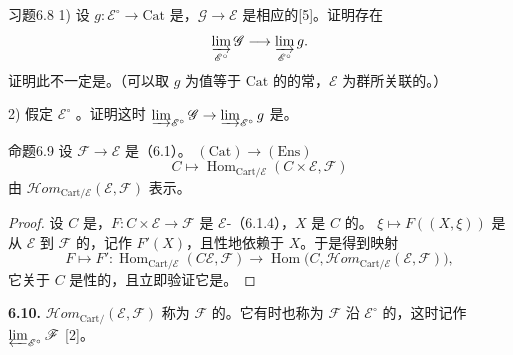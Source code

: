 \begin{SGAresult}{习题}{6.8}
1) 设 $g:\mathscr E^{\circ}\to\mathrm{Cat}$ 是，$\mathscr G\to\mathscr E$ 是相应的[5]。证明存在
\[
\varinjlim_{\mathscr E^{\circ}}\mathscr G\longrightarrow\varinjlim_{\mathscr E^{\circ}}g.
\]
证明此不一定是。（可以取 $g$ 为值等于 $\mathrm{Cat}$ 的的常，$\mathscr E$ 为群所关联的。）

2) 假定 $\mathscr E^{\circ}$ 。证明这时 $\varinjlim_{\mathscr E^{\circ}}\mathscr G\to\varinjlim_{\mathscr E^{\circ}}g$ 是。
\end{SGAresult}

\begin{SGAresult}{命题}{6.9}
设 $\mathscr F\to\mathscr E$ 是（6.1）。 $(\mathrm{Cat})\to(\mathrm{Ens})$
\[
C\longmapsto\operatorname{Hom}_{\mathrm{Cart}/\mathscr E}(C\times\mathscr E,\mathscr F)
\]
由 $\mathscr{H}\!om_{\mathrm{Cart}/\mathscr E}(\mathscr E,\mathscr F)$ 表示。
\end{SGAresult}
\begin{proof}
设 $C$ 是，$F:C\times\mathscr E\to\mathscr F$ 是 $\mathscr E$-（6.1.4），$X$ 是 $C$ 的。 $\xi\mapsto F((X,\xi))$ 是从 $\mathscr E$ 到 $\mathscr F$ 的，记作 $F'(X)$，且性地依赖于 $X$。于是得到映射
\[
F\longmapsto F':\operatorname{Hom}_{\mathrm{Cart}/\mathscr E}(C\mathscr E,\mathscr F)
\longrightarrow\operatorname{Hom}\bigl(C,\mathscr{H}\!om_{\mathrm{Cart}/\mathscr E}(\mathscr E,\mathscr F)\bigr),
\]
它关于 $C$ 是性的，且立即验证它是。
\end{proof}

\textbf{6.10.}  $\mathscr{H}\!om_{\mathrm{Cart}/}(\mathscr E,\mathscr F)$ 称为 $\mathscr F$ 的。它有时也称为 $\mathscr F$ 沿 $\mathscr E^{\circ}$ 的，这时记作 $\varprojlim_{\mathscr E^{\circ}}\mathscr F$ [2]。

